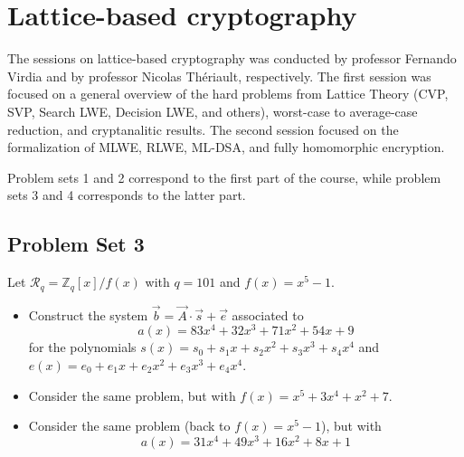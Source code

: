 \section{Lattice-based cryptography} \label{sec: lattices}
The sessions on lattice-based cryptography was conducted by professor Fernando Virdia and by professor Nicolas Thériault, respectively. The first session was focused on a general overview of the hard problems from Lattice Theory (CVP, SVP, Search LWE, Decision LWE, and others), worst-case to average-case reduction, and cryptanalitic results. The second session focused on the formalization of MLWE, RLWE, ML-DSA, and fully homomorphic encryption.

Problem sets 1 and 2 correspond to the first part of the course, while problem sets 3 and 4 corresponds to the latter part.

\subsection{Problem Set 3}\label{subsec: lat-ps3}
\begin{exercise}
  Let $\mathcal{R}_{q} = \mathbb{Z}_{q}[x]/f(x)$ with $q = 101$ and $f(x) = x^{5} - 1$. 

    \begin{itemize}
      \item Construct the system $\vec{b} = \vec{A}\cdot\vec{s} + \vec{e}$ associated to \[
  a(x) = 83x^{4} + 32x^{3} + 71x^{2} + 54x + 9
  \]
  for the polynomials $s(x) = s_{0} + s_{1}x + s_{2}x^{2} + s_{3}x^{3} + s_{4}x^{4}$ and $e(x) = e_{0} + e_{1}x + e_{2}x^{2} + e_{3}x^{3} + e_{4}x^{4}$.
      \item Consider the same problem, but with $f(x) = x^{5} + 3x^{4} + x^{2} + 7$.
      \item Consider the same problem (back to $f(x) = x^{5} - 1$), but with
      \[
      a(x) = 31x^{4} + 49x^{3} + 16x^{2} + 8x + 1
      \]

    \end{itemize}
\end{exercise}



